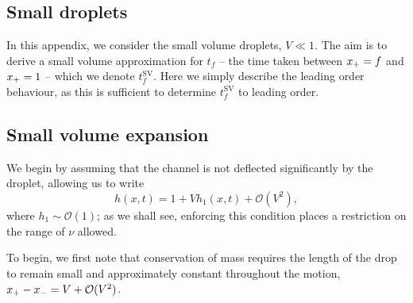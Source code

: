 \begin{subappendices}
\renewcommand{\thesection}{\Alph{section}}
\section{Small droplets}\label{A:Ch2:SmallDroplets}
In this appendix, we consider the small volume droplets, $V \ll 1$. The aim is to derive a small volume approximation for $t_f$ -- the time taken between $x_{+} = f$ and $x_{+} = 1$ --  which we denote $t_f^{\text{SV}}$. Here we simply describe the leading order behaviour, as this is sufficient to determine $t_f^{\text{SV}}$ to leading order. %
\subsection{Small volume expansion}\label{A:Ch2:SmallDroplets:SmallVolumeExpansion}
We begin by assuming that the channel is not deflected significantly by the droplet, allowing us to write
\begin{equation}\label{A:E:Ch2:SmallDroplets:Expansion}
h(x,t) = 1 + Vh_1(x,t) + \mathcal{O}(V^2),
\end{equation}
where $h_1 \sim \mathcal{O}(1)$; as we shall see, enforcing this condition places a restriction on the range of $\nu$ allowed.

To begin, we first note that conservation of mass requires the length of the drop to remain small and approximately constant throughout the motion, $x_{+} - x_{-} = V + \mathcal{O}(V^2)$.


\end{subappendices}

